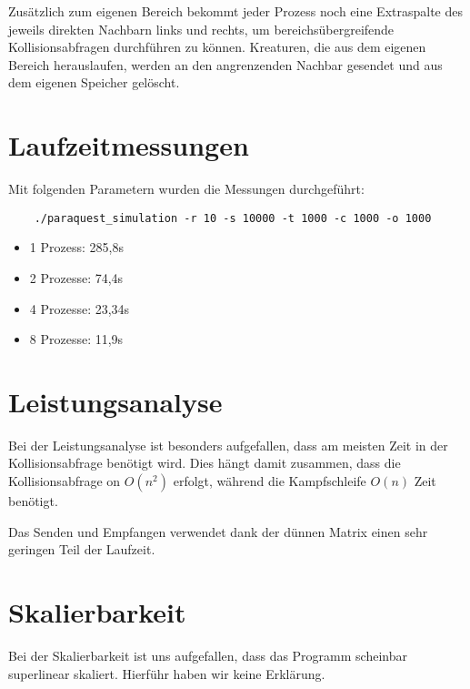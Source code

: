 \documentclass[a4paper,12pt]{article}
\begin{document}
Zusätzlich zum eigenen Bereich bekommt jeder Prozess noch
eine Extraspalte des jeweils direkten Nachbarn links und rechts, um
bereichsübergreifende Kollisionsabfragen durchführen zu können. Kreaturen, die
aus dem eigenen Bereich herauslaufen, werden an den angrenzenden Nachbar
gesendet und aus dem eigenen Speicher gelöscht.

\section{Laufzeitmessungen}
Mit folgenden Parametern wurden die Messungen durchgeführt:
\begin{verbatim}
	./paraquest_simulation -r 10 -s 10000 -t 1000 -c 1000 -o 1000
\end{verbatim}
\begin{itemize}
	\item 1 Prozess:  285,8s
	\item 2 Prozesse: 74,4s
	\item 4 Prozesse: 23,34s
	\item 8 Prozesse: 11,9s
\end{itemize}

\section{Leistungsanalyse}
Bei der Leistungsanalyse ist besonders aufgefallen, dass am meisten Zeit
in der Kollisionsabfrage benötigt wird. Dies hängt damit zusammen, dass die
Kollisionsabfrage on \(O(n^2)\) erfolgt, während die Kampfschleife \(O(n)\)
Zeit benötigt.

Das Senden und Empfangen verwendet dank der dünnen Matrix einen sehr geringen
Teil der Laufzeit.

\section{Skalierbarkeit}
Bei der Skalierbarkeit ist uns aufgefallen, dass das Programm scheinbar
superlinear skaliert. Hierführ haben wir keine Erklärung.
\end{document}
